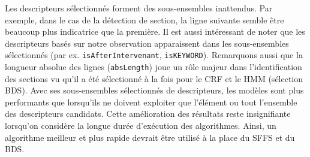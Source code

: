 Les descripteurs sélectionnés forment des sous-ensembles inattendus. Par exemple, dans le cas de la détection de section, la ligne suivante semble être beaucoup plus indicatrice que la première. Il est aussi intéressant de noter que les descripteurs basés sur notre observation apparaissent dans les sous-ensembles sélectionnés (par ex. \verb|isAfterIntervenant|, \verb|isKEYWORD|). Remarquons aussi que la longueur absolue des lignes (\verb|absLength|)  joue un rôle majeur dans l'identification des sections vu qu'il a été sélectionné à la fois pour le CRF et le HMM (sélection BDS). Avec ses sous-ensembles sélectionnés de descripteurs, les modèles sont plus performants que lorsqu'ils ne doivent exploiter que l'élément ou tout l'ensemble des descripteurs candidats.  Cette amélioration des résultats reste insignifiante lorsqu'on considère la longue durée d'exécution des algorithmes. Ainsi, un algorithme meilleur et plus rapide devrait être utilisé à la place du SFFS et du BDS.



